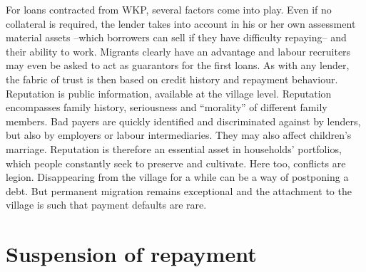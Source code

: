 \documentclass[a4paper, 11pt, onecolumn]{article}
\begin{document}
For loans contracted from WKP, several factors come into play.
Even if no collateral is required, the lender takes into account in his or her own assessment material assets --which borrowers can sell if they have difficulty repaying-- and their ability to work. 
Migrants clearly have an advantage and labour recruiters may even be asked to act as guarantors for the first loans. 
As with any lender, the fabric of trust is then based on credit history and repayment behaviour. 
Reputation is public information, available at the village level. 
Reputation encompasses family history, seriousness and ``morality'' of different family members. 
Bad payers are quickly identified and discriminated against by lenders, but also by employers or labour intermediaries. 
They may also affect children’s marriage. 
Reputation is therefore an essential asset in households’ portfolios, which people constantly seek to preserve and cultivate. 
Here too, conflicts are legion. 
Disappearing from the village for a while can be a way of postponing a debt. 
But permanent migration remains exceptional and the attachment to the village is such that payment defaults are rare.











\section{Suspension of repayment}
\label{section:repayment}
\end{document}
